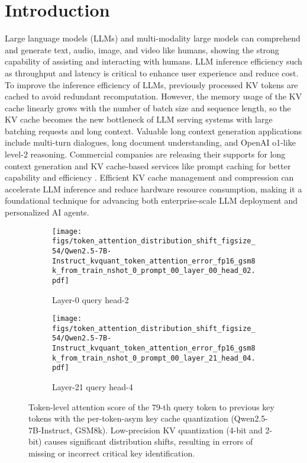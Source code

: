 \section{Introduction}
Large language models (LLMs) and multi-modality large models can comprehend and generate text, audio, image, and video like humans, showing the strong capability of assisting and interacting with humans.
LLM inference efficiency such as throughput and latency is critical to enhance user experience and reduce cost.
To improve the inference efficiency of LLMs, previously processed KV tokens are cached to avoid redundant recomputation. However, the memory usage of the KV cache linearly grows with the number of batch size and sequence length, so the KV cache becomes the new bottleneck of LLM serving systems with large batching requests and long context. 
Valuable long context generation applications include multi-turn dialogues, long document understanding, and OpenAI o1-like level-2 reasoning. Commercial companies are releasing their supports for long context generation and KV cache-based services like prompt caching for better capability and efficiency  \cite{OpenAI2024PromptCache, DeepSeek2024ContextCache}. 
Efficient KV cache management and compression can accelerate LLM inference and reduce hardware resource consumption, making it a foundational technique for advancing both enterprise-scale LLM deployment and personalized AI agents. 

\begin{figure}
\centering
    \begin{subfigure}{0.45\columnwidth}
    \texttt{[image: figs/token\_attention\_distribution\_shift\_figsize\_54/Qwen2.5-7B-Instruct\_kvquant\_token\_attention\_error\_fp16\_gsm8k\_from\_train\_nshot\_0\_prompt\_00\_layer\_00\_head\_02.pdf]}
    \caption{Layer-0 query head-2}
    \label{fig:attention_distribution_Qwen2.5-7B-Instruct_gsm8k_zeroshot_first_prompt_layer_2}
    \end{subfigure}\hspace{5mm}
    \begin{subfigure}{0.45\columnwidth}
    \texttt{[image: figs/token\_attention\_distribution\_shift\_figsize\_54/Qwen2.5-7B-Instruct\_kvquant\_token\_attention\_error\_fp16\_gsm8k\_from\_train\_nshot\_0\_prompt\_00\_layer\_21\_head\_04.pdf]}
    \caption{Layer-21 query head-4}
    \label{fig:attention_distribution_Qwen2.5-7B-Instruct_gsm8k_zeroshot_first_prompt_layer_21}
    \end{subfigure}
    \caption{Token-level attention score of the 79-th query token to previous key tokens with the per-token-asym key cache quantization (Qwen2.5-7B-Instruct, GSM8k). Low-precision KV quantization (4-bit and 2-bit) causes significant distribution shifts, resulting in errors of missing or incorrect critical key identification.}
    \label{fig:token_level_attention_distribution_shift_per_token_asym_quant_Qwen2.5-7B-Instruct}
\end{figure}

